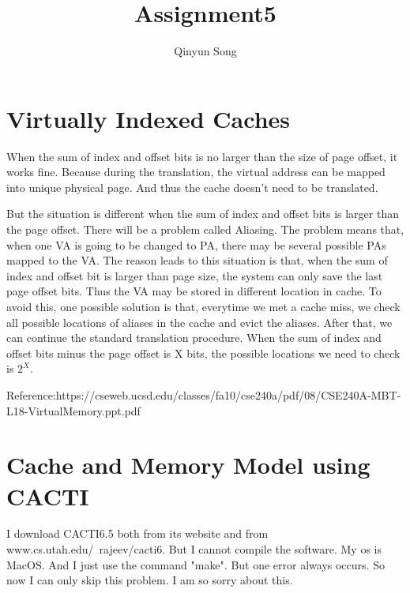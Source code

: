 \documentclass{article}
\title{Assignment5}
\author{Qinyun Song}
\date{}
\begin{document}
\maketitle

\section{Virtually Indexed Caches}
    When the sum of index and offset bits is no larger than the size of page offset, it works fine. Because during the translation, the virtual address can be mapped into unique physical page. And thus the cache doesn't need to be translated. \newline

    But the situation is different when the sum of index and offset bits is larger than the page offset. There will be a problem called Aliasing. The problem means that, when one VA is going to be changed to PA, there may be several possible PAs mapped to the VA. The reason leads to this situation is that, when the sum of index and offset bit is larger than page size, the system can only save the last page offset bits. Thus the VA may be stored in different location in cache. To avoid this, one possible solution is that, everytime we met a cache miss, we check all possible locations of aliases in the cache and evict the aliases. After that, we can continue the standard translation procedure. When the sum of index and offset bits minus the page offset is X bits, the possible locations we need to check is $2^X$.
    \newline

    Reference:https://cseweb.ucsd.edu/classes/fa10/cse240a/pdf/08/CSE240A-MBT-L18-VirtualMemory.ppt.pdf

\section{Cache and Memory Model using CACTI}
    I download CACTI6.5 both from its website and from www.cs.utah.edu/~rajeev/cacti6. But I cannot compile the software. My os is MacOS. And I just use the command "make". But one error always occurs. So now I can only skip this problem. I am so sorry about this.
\end{document}
